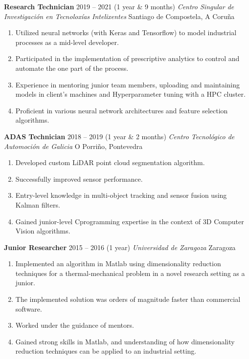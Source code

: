 \documentclass[a4]{article}
\newcommand{\cvitem}[4]{
    \noindent
    \textbf{\large #1}  \hfill {\small #2} \newline
    \textit{#3}         \hfill #4
}
\def\Cpp{{C\nolinebreak[4]\hspace{-.05em}\raisebox{.1ex}{++}}}
\begin{document}
\vspace{12pt}%
\cvitem
    {Research Technician}
    {2019 -- 2021 (1 year \& 9 months)}
    {Centro Singular de Investigación en Tecnoloxías Intelixentes}
    {Santiago de Compostela, A Coruña}
\begin{enumerate}[label=\textbullet, itemsep=-1pt, rightmargin=0.5cm]
  \item Utilized neural networks (with Keras and Tensorflow) to model
industrial processes as a mid-level developer.\item Participated in the
implementation of prescriptive analytics to control and automate the one
part of the process.\item Experience in mentoring junior team members,
uploading and maintaining models in client's machines and Hyperparameter
tuning with a HPC cluster.\item Proficient in various neural network
architectures and feature selection algorithms.
\end{enumerate}

\vspace{12pt}%
\cvitem
    {ADAS Technician}
    {2018 -- 2019 (1 year \& 2 months)}
    {Centro Tecnológico de Automoción de Galicia}
    {O Porriño, Pontevedra}
\begin{enumerate}[label=\textbullet, itemsep=-1pt, rightmargin=0.5cm]
  \item Developed custom LiDAR point cloud segmentation
algorithm.\item Successfully improved sensor
performance.\item Entry-level knowledge in multi-object tracking and
sensor fusion using Kalman filters.\item Gained junior-level
\Cpp programming expertise in the context of 3D Computer Vision
algorithms.
\end{enumerate}

\vspace{12pt}%
\cvitem
    {Junior Researcher}
    {2015 -- 2016 (1 year)}
    {Universidad de Zaragoza}
    {Zaragoza}
\begin{enumerate}[label=\textbullet, itemsep=-1pt, rightmargin=0.5cm]
  \item Implemented an algorithm in Matlab using dimensionality
reduction techniques for a thermal-mechanical problem in a novel
research setting as a junior.\item The implemented solution was orders
of magnitude faster than commercial software.\item Worked under the
guidance of mentors.\item Gained strong skills in Matlab, and
understanding of how dimensionality reduction techniques can be applied
to an industrial setting.
\end{enumerate}
\end{document}
